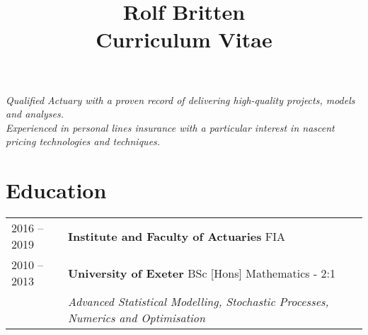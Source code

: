 \documentclass[11pt]{article}
\title{\bfseries \Huge Rolf Britten \\ \Large Curriculum Vitae}
\date{}
\begin{document}
\vspace{-40mm}
\maketitle
\vspace{-24mm}

\begin{center} \emph{Qualified Actuary with a proven record of delivering high-quality projects, models and analyses.\\Experienced in personal lines insurance with a particular interest in nascent pricing technologies and techniques.} \end{center}

\section*{Education}
\begin{tabular}{l | l l}
2016 -- 2019 & \textbf{Institute and Faculty of Actuaries} FIA \\
2010 -- 2013 & \textbf{University of Exeter} BSc [Hons] Mathematics - 2:1\\
& \hspace{4mm} \textit{Advanced Statistical Modelling, Stochastic Processes, Numerics and Optimisation }\\
\end{tabular}
\end{document}
